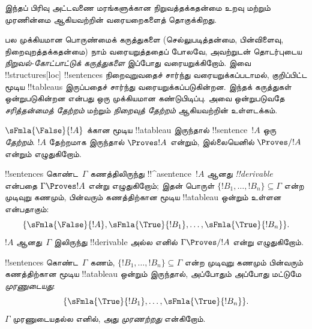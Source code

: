 \documentclass[../../../include/open-logic-section]{subfiles}
\begin{document}
      {}
      {}
      

\begin{editorial}
இந்தப் பிரிவு அட்டவணை மரங்களுக்கான நிறுவத்தக்கதன்மை உறவு மற்றும் முரணின்மை
ஆகியவற்றின் வரையறைகளைத் தொகுக்கிறது.
\end{editorial}

\begin{explain}
பல முக்கியமான பொருண்மைக் கருத்துகளை (செல்லுபடித்தன்மை, பின்விளைவு,
நிறைவுறத்தக்கதன்மை) நாம் வரையறுத்ததைப் போலவே, அவற்றுடன் தொடர்புடைய
\emph{நிறுவல்-கோட்பாட்டுக் கருத்துகளை} இப்போது வரையறுக்கிறோம். இவை
!!{structure}s[loc] !!{sentence}s நிறைவுறுவதைச் சார்ந்து வரையறுக்கப்படாமல்,
குறிப்பிட்ட மூடிய !!{tableau}s இருப்பதைச் சார்ந்து வரையறுக்கப்படுகின்றன.
இந்தக் கருத்துகள் ஒன்றுபடுகின்றன என்பது ஒரு முக்கியமான கண்டுபிடிப்பு. அவை
ஒன்றுபடுவதே \emph{சரித்தன்மைத் தேற்றம்} மற்றும் \emph{நிறைவுத் தேற்றம்}
ஆகியவற்றின் உள்ளடக்கம்.
\end{explain}


\begin{defn}[தேற்றங்கள்]
$\sFmla{\False}{!A}$ க்கான மூடிய !!a{tableau} இருந்தால் !!{sentence}~$!A$
ஒரு \emph{தேற்றம்}. $!A$ தேற்றமாக இருந்தால் $\Proves !A$ என்றும்,
இல்லையெனில் $\Proves/ !A$ என்றும் எழுதுகிறோம்.
\end{defn}

\begin{defn}[!!^{derivability}]
!!{sentence}s கொண்ட~$\Gamma$ கணத்திலிருந்து !!^a{sentence}~$!A$ ஆனது
\emph{!!{derivable}} என்பதை $\Gamma \Proves !A$ என்று எழுதுகிறோம்; இதன்
பொருள் $\{!B_1, \dots, !B_n\} \subseteq \Gamma$ என்ற முடிவுறு கணமும்,
பின்வரும் கணத்திற்கான மூடிய !!a{tableau} ஒன்றும் உள்ளன என்பதாகும்:
\[
\{
  \sFmla{\False}{!A},
  \sFmla{\True}{!B_1}, \dots,
  \sFmla{\True}{!B_n}
  \}.
\]
$!A$ ஆனது~$\Gamma$ இலிருந்து !!{derivable} அல்ல எனில் $\Gamma \Proves/
!A$ என்று எழுதுகிறோம்.
\end{defn}

\begin{defn}[முரணின்மை]
!!{sentence}s கொண்ட~$\Gamma$ கணம், $\{!B_1, \dots, !B_n\} \subseteq
\Gamma$ என்ற முடிவுறு கணமும் பின்வரும் கணத்திற்கான மூடிய !!a{tableau} ஒன்றும்
இருந்தால், அப்போதும் அப்போது மட்டுமே \emph{முரணுடையது}:
\[
\{
  \sFmla{\True}{!B_1}, \dots,
  \sFmla{\True}{!B_n}  
  \}.
\]
$\Gamma$ முரணுடையதல்ல எனில், அது \emph{முரணற்றது} என்கிறோம்.
\end{defn}
\end{document}
